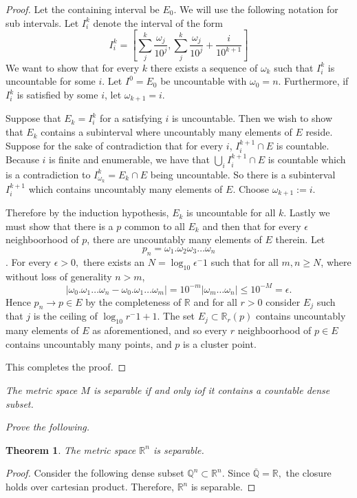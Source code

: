 \documentclass[letter]{article}
\newtheorem{theorem}{Theorem}
\newenvironment{menumerate}{%
  \edef\backupindent{\the\parindent}%
  \enumerate%
  \setlength{\parindent}{\backupindent}%
}{\endenumerate}
\begin{document}
\begin{menumerate}
\begin{proof}
		Let the containing interval be $E_0.$ We will use the following notation for sub intervals. Let $I^k_i$ denote the interval of the form
		 $$I^k_i = \left[ \sum_j^k \frac{\omega_j}{10^j}, \sum_j^k \frac{\omega_j}{10^j}  + \frac{i}{10^{k+1}}\right]$$
		  We want to show that for every $k$ there exists a sequence of $\omega_k$ such that $I^k_i$ is uncountable for some $i.$ Let $I^0 = E_0$ be uncountable with $\omega_0 = n$. Furthermore, if $I^k_i$ is satisfied by some $i$, let $\omega_{k+1} = i.$


		  Suppose that $E_k = I^k_i$ for a satisfying $i$ is uncountable. Then we wish to show that $E_k$ contains a subinterval where uncountably many elements of $E$ reside. Suppose for the sake of contradiction that for every $i$, 
		  $I^{k+1}_i \cap E$ is countable. Because $i$ is finite and enumerable, we have that $ \bigcup_i I^{k+1}_i \cap E$ is countable which is a contradiction to $I^k_{\omega_k} = E_k \cap E$ being uncountable. So there is a subinterval $I^{k+1}_i$ which contains uncountably many elements of $E$. Choose $\omega_{k+1} := i$. 

		  Therefore by the induction hypothesis, $E_k$ is uncountable for all $k$. Lastly we must show that there is a $p$ common to all $E_k$ and then that for every $\epsilon$ neighboorhood of $p$, there are uncountably many elements of $E$ therein. Let $$p_n = \omega_1.\omega_2\omega_3\dots\omega_n$$. For every $\epsilon > 0,$ there exists an $N = \log_{10} \epsilon ^-1$ such that for all $m,n \geq N$, where without loss of generality $n>m$,  $$|\omega_0.\omega_1\dots\omega_n - \omega_0.\omega_1\dots\omega_m| = 10^{-m}|\omega_m\dots\omega_n| \leq 10^{-M} = \epsilon. $$ Hence $p_n \to p \in E$ by the completeness of $\mathbb{R}$ and for all $r > 0$ consider $E_j$ such that $j$ is the ceiling of $\log_{10}r^-1+1$. The set $E_j \subset \mathbb{R}_r(p)$ contains uncountably many elements of $E$ as aforementioned, and so every $r$ neighboorhood of $p \in E$ contains uncountably many points, and $p$ is a cluster point.

		  This completes the proof.
	\end{proof}
	\item \emph{The metric space $M$ is separable if and only iof it contains a countable dense subset.}
		\begin{menumerate}
			\item \emph{Prove the following.}
			\begin{theorem}
				The metric space $\mathbb{R}^n$ is separable.
			\end{theorem}
			\begin{proof}
				Consider the following dense subset $\mathbb{Q}^n \subset \mathbb{R}^n.$ Since $ \overline{\mathbb{Q}} = \mathbb{R},$ the closure holds over cartesian product. Therefore, $\mathbb{R}^n$ is separable. 
			\end{proof}


\end{menumerate}
\end{menumerate}
\end{document}
